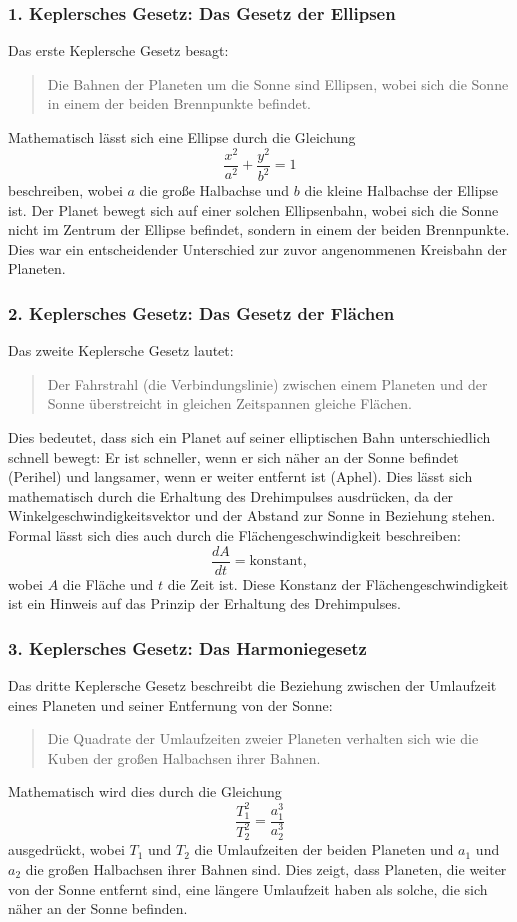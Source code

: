 \documentclass[a4paper,12pt,twoside]{article}
\begin{document}
\subsubsection{1. Keplersches Gesetz: Das Gesetz der Ellipsen}
Das erste Keplersche Gesetz besagt:
\begin{quote}
    Die Bahnen der Planeten um die Sonne sind Ellipsen, wobei sich die Sonne in einem der beiden Brennpunkte befindet.
\end{quote}
Mathematisch lässt sich eine Ellipse durch die Gleichung
\[
\frac{x^2}{a^2} + \frac{y^2}{b^2} = 1
\]
beschreiben, wobei \(a\) die große Halbachse und \(b\) die kleine Halbachse der Ellipse ist. Der Planet bewegt sich auf einer solchen Ellipsenbahn, wobei sich die Sonne nicht im Zentrum der Ellipse befindet, sondern in einem der beiden Brennpunkte. Dies war ein entscheidender Unterschied zur zuvor angenommenen Kreisbahn der Planeten.
\subsubsection{2. Keplersches Gesetz: Das Gesetz der Flächen}
Das zweite Keplersche Gesetz lautet:
\begin{quote}
    Der Fahrstrahl (die Verbindungslinie) zwischen einem Planeten und der Sonne überstreicht in gleichen Zeitspannen gleiche Flächen.
\end{quote}
Dies bedeutet, dass sich ein Planet auf seiner elliptischen Bahn unterschiedlich schnell bewegt: Er ist schneller, wenn er sich näher an der Sonne befindet (Perihel) und langsamer, wenn er weiter entfernt ist (Aphel). Dies lässt sich mathematisch durch die Erhaltung des Drehimpulses ausdrücken, da der Winkelgeschwindigkeitsvektor und der Abstand zur Sonne in Beziehung stehen. Formal lässt sich dies auch durch die Flächengeschwindigkeit beschreiben:
\[
\frac{dA}{dt} = \text{konstant},
\]
wobei \(A\) die Fläche und \(t\) die Zeit ist. Diese Konstanz der Flächengeschwindigkeit ist ein Hinweis auf das Prinzip der Erhaltung des Drehimpulses.
\subsubsection{3. Keplersches Gesetz: Das Harmoniegesetz}
Das dritte Keplersche Gesetz beschreibt die Beziehung zwischen der Umlaufzeit eines Planeten und seiner Entfernung von der Sonne:
\begin{quote}
    Die Quadrate der Umlaufzeiten zweier Planeten verhalten sich wie die Kuben der großen Halbachsen ihrer Bahnen.
\end{quote}
Mathematisch wird dies durch die Gleichung
\[
\frac{T_1^2}{T_2^2} = \frac{a_1^3}{a_2^3}
\]
ausgedrückt, wobei \(T_1\) und \(T_2\) die Umlaufzeiten der beiden Planeten und \(a_1\) und \(a_2\) die großen Halbachsen ihrer Bahnen sind. Dies zeigt, dass Planeten, die weiter von der Sonne entfernt sind, eine längere Umlaufzeit haben als solche, die sich näher an der Sonne befinden.
\end{document}
